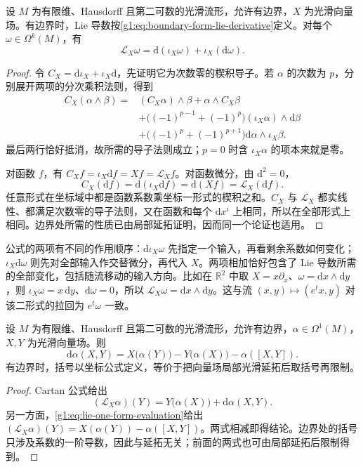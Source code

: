 \begin{theorem}[Cartan 公式]\label{g1:thm:cartan-formula}
	设 \(M\) 为有限维、Hausdorff 且第二可数的光滑流形，允许有边界，\(X\) 为光滑向量场。有边界时，Lie 导数按\eqref{g1:eq:boundary-form-lie-derivative}定义。对每个 \(\omega\in\Omega^k(M)\)，有
	\[
		\mathcal L_X\omega=\mathrm{d}(\iota_X\omega)+\iota_X(\mathrm{d}\omega).
	\]
\end{theorem}
\begin{proof}
	令 \(C_X=\mathrm{d}\iota_X+\iota_X\mathrm{d}\)，先证明它为次数零的楔积导子。若 \(\alpha\) 的次数为 \(p\)，分别展开两项的分次乘积法则，得到
	\begin{align*}
		C_X(\alpha\wedge\beta)
		={}&(C_X\alpha)\wedge\beta+\alpha\wedge C_X\beta\\
		&+\bigl((-1)^{p-1}+(-1)^p\bigr)(\iota_X\alpha)\wedge\mathrm{d}\beta\\
		&+\bigl((-1)^p+(-1)^{p+1}\bigr)\mathrm{d}\alpha\wedge\iota_X\beta.
	\end{align*}
	最后两行恰好抵消，故所需的导子法则成立；\(p=0\) 时含 \(\iota_X\alpha\) 的项本来就是零。

	对函数 \(f\)，有 \(C_Xf=\iota_X\mathrm{d}f=Xf=\mathcal L_Xf\)。对函数微分，由 \(\mathrm{d}^2=0\)，
	\[
		C_X(\mathrm{d}f)=\mathrm{d}(\iota_X\mathrm{d}f)=\mathrm{d}(Xf)=\mathcal L_X(\mathrm{d}f).
	\]
	任意形式在坐标域中都是函数系数乘坐标一形式的楔积之和。\(C_X\) 与 \(\mathcal L_X\) 都实线性、都满足次数零的导子法则，又在函数和每个 \(\mathrm{d}x^i\) 上相同，所以在全部形式上相同。边界处所需的性质已由局部延拓证明，因而同一个论证也适用。
\end{proof}

公式的两项有不同的作用顺序：\(\mathrm{d}\iota_X\omega\) 先指定一个输入，再看剩余系数如何变化；\(\iota_X\mathrm{d}\omega\) 则先对全部输入作交替微分，再代入 \(X\)。两项相加恰好包含了 Lie 导数所需的全部变化，包括随流移动的输入方向。比如在 \(\mathbb R^2\) 中取 \(X=x\partial_x\)、\(\omega=\mathrm{d}x\wedge\mathrm{d}y\)，则 \(\iota_X\omega=x\,\mathrm{d}y\)、\(\mathrm{d}\omega=0\)，所以 \(\mathcal L_X\omega=\mathrm{d}x\wedge\mathrm{d}y\)。这与流 \((x,y)\mapsto(e^t x,y)\) 对该二形式的拉回为 \(e^t\omega\) 一致。

\begin{proposition}\label{g1:prop:one-form-exterior-evaluation}
	设 \(M\) 为有限维、Hausdorff 且第二可数的光滑流形，允许有边界，\(\alpha\in\Omega^1(M)\)，\(X,Y\) 为光滑向量场。则
	\begin{equation}
		\label{g1:eq:exterior-one-form-evaluation}
		\mathrm{d}\alpha(X,Y)=X\bigl(\alpha(Y)\bigr)-Y\bigl(\alpha(X)\bigr)-\alpha([X,Y]).
	\end{equation}
	有边界时，括号以坐标公式定义，等价于把向量场局部光滑延拓后取括号再限制。
\end{proposition}
\begin{proof}
	Cartan 公式给出
	\[
		(\mathcal L_X\alpha)(Y)=Y\bigl(\alpha(X)\bigr)+\mathrm{d}\alpha(X,Y).
	\]
	另一方面，\eqref{g1:eq:lie-one-form-evaluation}给出 \((\mathcal L_X\alpha)(Y)=X(\alpha(Y))-\alpha([X,Y])\)。两式相减即得结论。边界处的括号只涉及系数的一阶导数，因此与延拓无关；前面的两式也可由局部延拓后限制得到。
\end{proof}

